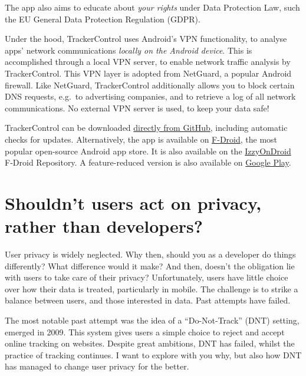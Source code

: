 \documentclass[
]{book}
\begin{document}
The app also aims to educate about \emph{your rights} under Data Protection Law, such the EU General Data Protection Regulation (GDPR).

Under the hood, TrackerControl uses Android's VPN functionality, to analyse apps' network communications \emph{locally on the Android device}. This is accomplished through a local VPN server, to enable network traffic analysis by TrackerControl. This VPN layer is adopted from NetGuard, a popular Android firewall. Like NetGuard, TrackerControl additionally allows you to block certain DNS requests, e.g.~to advertising companies, and to retrieve a log of all network communications. No external VPN server is used, to keep your data safe!

TrackerControl can be downloaded \href{https://github.com/OxfordHCC/tracker-control-android/releases}{directly from GitHub}, including automatic checks for updates. Alternatively, the app is available on \href{https://f-droid.org/packages/net.kollnig.missioncontrol.fdroid}{F-Droid}, the most popular open-source Android app store. It is also available on the \href{https://apt.izzysoft.de/fdroid/index/apk/net.kollnig.missioncontrol}{IzzyOnDroid} F-Droid Repository. A feature-reduced version is also available on \href{https://play.google.com/store/apps/details?id=net.kollnig.missioncontrol.play}{Google Play}.

\hypertarget{shouldnt-users-act-on-privacy-rather-than-developers}{%
\section{Shouldn't users act on privacy, rather than developers?}\label{shouldnt-users-act-on-privacy-rather-than-developers}}

User privacy is widely neglected. Why then, should you as a developer do things differently? What difference would it make? And then, doesn't the obligation lie with users to take care of their privacy? Unfortunately, users have little choice over how their data is treated, particularly in mobile. The challenge is to strike a balance between users, and those interested in data. Past attempts have failed.

The most notable past attempt was the idea of a ``Do-Not-Track'' (DNT) setting, emerged in 2009. This system gives users a simple choice to reject and accept online tracking on websites. Despite great ambitions, DNT has failed, whilst the practice of tracking continues. I want to explore with you why, but also how DNT has managed to change user privacy for the better.
\end{document}
